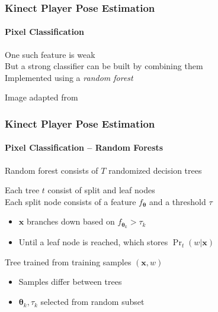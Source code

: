 \documentclass[xetex,professionalfont]{beamer}
\renewcommand{\vec}[1]{\ensuremath{\mathbf{#1}}}
\newcommand{\vx}{\vec{x}}
\newcommand{\bth}{\boldsymbol{\theta}}
\begin{document}

\begin{frame}
\frametitle{Kinect Player Pose Estimation}
\framesubtitle{Pixel Classification}

One such feature is weak\\\medskip
But a strong classifier can be built by combining them\\\medskip 
Implemented using a \emph{random forest} %

\bigskip
\begin{center}
    {\centering Image adapted from \cite{shotton2011}}
\end{center}

\end{frame}


\begin{frame}
\frametitle{Kinect Player Pose Estimation}
\framesubtitle{Pixel Classification -- Random Forests}

Random forest consists of $T$ randomized decision trees

\bigskip
Each tree $t$ consist of split and leaf nodes\\\medskip
Each split node consists of a feature $f_{\bth}$ and a threshold $\tau$
\begin{itemize}
    \item $\vx$ branches down based on $f_{\bth_k}>\tau_k$
    \item Until a leaf node is reached, which stores $\Pr_t(w|\vx)$
\end{itemize}

\bigskip
Tree trained from training samples $(\vx,w)$ %
\begin{itemize}
    \item Samples differ between trees
    \item $\bth_k,\tau_k$ selected from random subset %
\end{itemize}

\end{frame}
\end{document}
